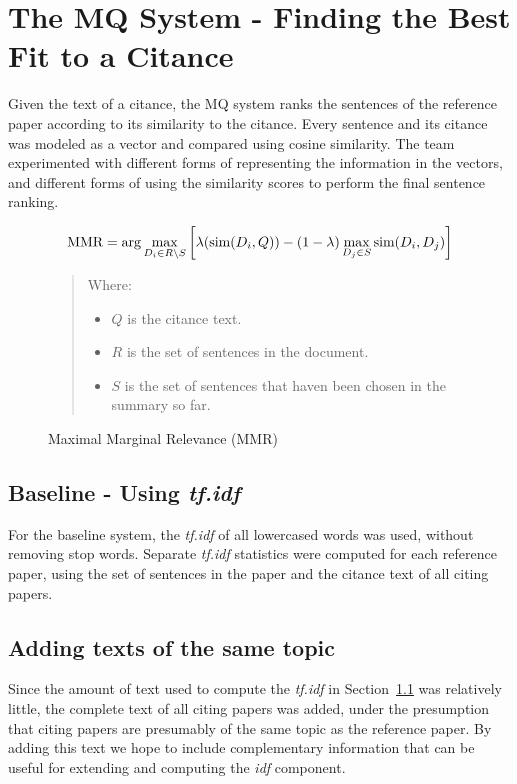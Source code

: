 \documentclass[11pt]{article}
\begin{document}
\section{The MQ System - Finding the Best Fit to a Citance}

Given the text of a citance, the MQ system ranks the sentences of the reference paper according to its similarity to the citance. Every sentence and its citance was modeled as a vector and compared using cosine similarity. The team experimented with different forms of representing the information in the vectors, and different forms of using the similarity scores to perform the final sentence ranking.

\begin{figure*}
$$
\hbox{MMR} = \arg\max_{D_i\in R\setminus S}\left[\lambda(\hbox{sim}(D_i,Q)) -
(1-\lambda) \max_{D_j\in S} \hbox{sim}(D_i,D_j)\right]
$$  
\begin{quote}
Where:
\begin{itemize}
\item $Q$ is the citance text.
\item $R$ is the set of sentences in the document.
\item $S$ is the set of sentences that haven been chosen in the
  summary so far.  
\end{itemize}
\end{quote}
  \caption{Maximal Marginal Relevance (MMR)}
  \label{fig:mmr}
\end{figure*}


\subsection{Baseline - Using \emph{tf.idf}}
\label{sec:tfidf}
For the baseline system, the \emph{tf.idf} of all lowercased words was used, 
without removing stop words. Separate \emph{tf.idf} statistics were computed 
for each reference paper, using the set of sentences in the paper and the citance 
text of all citing papers.

\subsection{Adding texts of the same topic}
\label{sec:topics}
Since the amount of text used to compute the \emph{tf.idf} in 
Section~\ref{sec:tfidf} was relatively little, the complete text of all citing 
papers was added, under the presumption that citing papers are presumably of 
the same topic as the reference paper. By adding this text we hope to include 
complementary information that can be useful for extending and computing 
the \emph{idf} component. 
\end{document}

